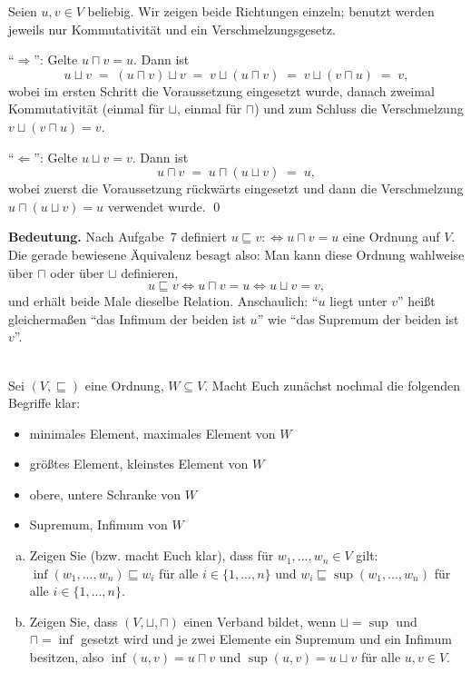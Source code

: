 \begin{loesung}
Seien $u,v\in V$ beliebig. Wir zeigen beide Richtungen einzeln; benutzt werden jeweils nur Kommutativität und ein Verschmelzungsgesetz.

\enquote{$\Rightarrow$}: Gelte $u\sqcap v=u$. Dann ist
\[u\sqcup v \;=\; (u\sqcap v)\sqcup v \;=\; v\sqcup(u\sqcap v) \;=\; v\sqcup(v\sqcap u) \;=\; v,\]
wobei im ersten Schritt die Voraussetzung eingesetzt wurde, danach zweimal Kommutativität (einmal für $\sqcup$, einmal für $\sqcap$) und zum Schluss die Verschmelzung $v\sqcup(v\sqcap u)=v$.

\enquote{$\Leftarrow$}: Gelte $u\sqcup v=v$. Dann ist
\[u\sqcap v \;=\; u\sqcap(u\sqcup v) \;=\; u,\]
wobei zuerst die Voraussetzung rückwärts eingesetzt und dann die Verschmelzung $u\sqcap(u\sqcup v)=u$ verwendet wurde. \qed

\textbf{Bedeutung.} Nach Aufgabe~7 definiert $u\sqsubseteq v:\Leftrightarrow u\sqcap v=u$ eine Ordnung auf $V$. Die gerade bewiesene Äquivalenz besagt also: Man kann diese Ordnung wahlweise über $\sqcap$ oder über $\sqcup$ definieren,
\[u\sqsubseteq v \iff u\sqcap v=u \iff u\sqcup v=v,\]
und erhält beide Male dieselbe Relation. Anschaulich: \enquote{$u$ liegt unter $v$} heißt gleichermaßen \enquote{das Infimum der beiden ist $u$} wie \enquote{das Supremum der beiden ist $v$}.
\end{loesung}

\\
Sei $(V,\sqsubseteq)$ eine Ordnung, $W\subseteq V$. Macht Euch zunächst nochmal die folgenden Begriffe klar:
\begin{itemize}
  \item minimales Element, maximales Element von $W$
  \item größtes Element, kleinstes Element von $W$
  \item obere, untere Schranke von $W$
  \item Supremum, Infimum von $W$
\end{itemize}
\begin{enumerate}[a)]
  \item Zeigen Sie (bzw. macht Euch klar), dass für $w_1,...,w_n\in V$ gilt: $\inf(w_1,...,w_n)\sqsubseteq w_i$ für alle $i\in\{1,...,n\}$ und $w_i\sqsubseteq \sup(w_1,...,w_n)$ für alle $i\in\{1,...,n\}$.
  \item Zeigen Sie, dass $(V,\sqcup,\sqcap)$ einen Verband bildet, wenn $\sqcup=\sup$ und $\sqcap=\inf$ gesetzt wird und je zwei Elemente ein Supremum und ein Infimum besitzen, also $\inf(u,v)=u\sqcap v$ und $\sup(u,v)=u\sqcup v$ für alle $u,v\in V$.
\end{enumerate}

